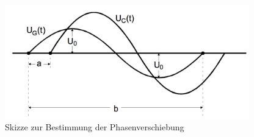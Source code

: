 \begin{figure}
  \centering
  \includegraphics[width=300pt]{data/phasenverschiebung.png}
  \caption{Skizze zur Bestimmung der Phasenverschiebung \cite{Versuchsanleitung2}}
  \label{fig:phasenverschiebung}
\end{figure}
